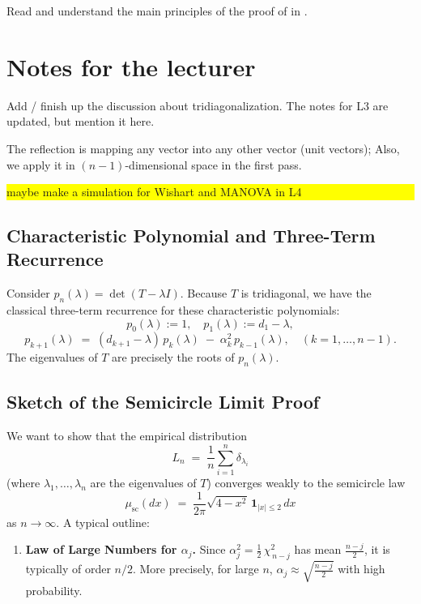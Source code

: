 \documentclass[letterpaper,11pt,oneside,reqno]{article}
\numberwithin{equation}{section}
\theoremstyle{definition}
\newenvironment{lnotes}{\section*{Notes for the lecturer}}{}
\begin{document}
Read and understand the main principles of the 
proof of 
in \cite{dumitriu2002matrix}.






\begin{lnotes}

	Add / finish up the discussion about tridiagonalization. The notes for L3 are updated, but
	mention it here.

	The reflection is mapping any vector into any other vector (unit vectors);
	Also, we apply it in $(n-1)$-dimensional space in the first pass.


\colorbox{yellow}{\parbox{.7\textwidth}{maybe make a simulation for Wishart and MANOVA in L4}}


\subsection{Characteristic Polynomial and Three-Term Recurrence}

Consider \(p_n(\lambda) = \det(T - \lambda I)\).  Because \(T\) is tridiagonal, we have the classical three-term recurrence for these characteristic polynomials:
\[
  p_0(\lambda) := 1,\quad
  p_1(\lambda) := d_1 - \lambda,
\]
\[
  p_{k+1}(\lambda)
  \;=\;
  (d_{k+1} - \lambda)\,p_k(\lambda)
  \;-\;\alpha_k^2\,p_{k-1}(\lambda),
  \quad
  (k=1,\dots,n-1).
\]
The eigenvalues of \(T\) are precisely the roots of \(p_n(\lambda)\).

\subsection{Sketch of the Semicircle Limit Proof}

We want to show that the empirical distribution
\[
  L_n
  \;=\;
  \frac{1}{n}\sum_{i=1}^n \delta_{\lambda_i}
\]
(where \(\lambda_1,\dots,\lambda_n\) are the eigenvalues of \(T\)) converges weakly to the semicircle law
\[
  \mu_{\mathrm{sc}}(dx)
  \;=\;
  \frac{1}{2\pi}\sqrt{4 - x^2}\,\mathbf{1}_{|x|\le 2}\,dx
\]
as \(n\to\infty\).  A typical outline:

\begin{enumerate}[1.]
\item \textbf{Law of Large Numbers for \(\alpha_j\).}
   Since \(\alpha_j^2 = \tfrac12\,\chi^2_{\,n-j}\) has mean \(\tfrac{n-j}{2}\), it is typically of order \(n/2\).  More precisely, for large \(n\), \(\alpha_j \approx \sqrt{\tfrac{n-j}{2}}\) with high probability.


\end{enumerate}
\end{lnotes}
\end{document}
